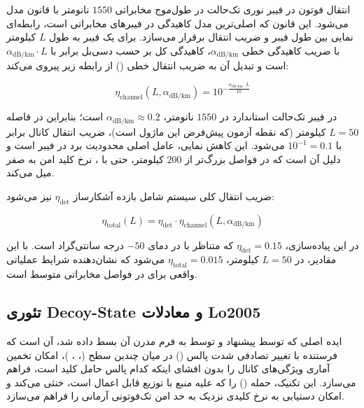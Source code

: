 انتقال فوتون در فیبر نوری تک‌حالت در طول‌موج مخابراتی $1550$ نانومتر با قانون  مدل می‌شود. این قانون که اصلی‌ترین مدل کاهیدگی در فیبرهای مخابراتی است، رابطه‌ای نمایی بین طول فیبر و ضریب انتقال برقرار می‌سازد. برای یک فیبر به طول $L$ کیلومتر با ضریب کاهیدگی خطی $\alpha_{\text{dB/km}}$، کاهیدگی کل بر حسب دسی‌بل برابر با $\alpha_{\text{dB/km}} \cdot L$ است و تبدیل آن به ضریب انتقال خطی () از رابطه زیر پیروی می‌کند:

\begin{equation}
	\eta_{\text{channel}}(L, \alpha_{\text{dB/km}}) = 10^{-\frac{\alpha_{\text{dB/km}} \cdot L}{10}}
\end{equation}

در فیبر تک‌حالت استاندارد در $1550$ نانومتر، $\alpha_{\text{dB/km}} \approx 0.2$ است؛ بنابراین در فاصله $L = 50$ کیلومتر (که نقطه آزمون پیش‌فرض این ماژول است)، ضریب انتقال کانال برابر با $10^{-1} = 0.1$ می‌شود. این کاهش نمایی، عامل اصلی محدودیت برد  در فیبر است و دلیل آن است که در فواصل بزرگ‌تر از $200$ کیلومتر، حتی با ، نرخ کلید امن به صفر میل می‌کند.

ضریب انتقال کلی سیستم شامل بازده آشکارساز $\eta_{\text{det}}$ نیز می‌شود:

\begin{equation}
	\eta_{\text{total}}(L) = \eta_{\text{det}} \cdot \eta_{\text{channel}}(L, \alpha_{\text{dB/km}})
\end{equation}

در این پیاده‌سازی، $\eta_{\text{det}} = 0.15$ که متناظر با  در دمای $-50$ درجه سانتی‌گراد است. با این مقادیر، در $L = 50$ کیلومتر، $\eta_{\text{total}} = 0.015$ می‌شود که نشان‌دهنده شرایط عملیاتی واقعی برای  در فواصل مخابراتی متوسط است.

\subsection{تئوری Decoy-State و معادلات Lo2005}

ایده اصلی  که توسط  پیشنهاد و توسط  به فرم مدرن آن بسط داده شد، آن است که فرستنده با تغییر تصادفی شدت پالس () در میان چندین سطح (، ، )، امکان تخمین آماری ویژگی‌های کانال را بدون افشای اینکه کدام پالس حامل کلید است، فراهم می‌سازد. این تکنیک، حمله  () را که علیه منبع  با توزیع  قابل اعمال است، خنثی می‌کند و امکان دستیابی به نرخ کلیدی نزدیک به حد امن تک‌فوتونی آرمانی را فراهم می‌سازد.

